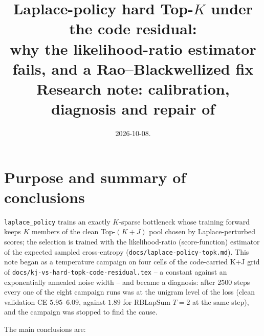 \documentclass[11pt,a4paper]{article}
\title{Laplace-policy hard Top-$K$ under the code residual:\\
why the likelihood-ratio estimator fails, and a Rao--Blackwellized fix\\[2pt]
\large Research note: calibration, diagnosis and repair of \code{surrogate\_mode: laplace\_policy}}
\author{}
\date{2026-10-08.}
\newcommand{\code}[1]{\texttt{#1}}
\begin{document}
\maketitle
\vspace{-2em}

\section{Purpose and summary of conclusions}

\code{laplace\_policy} trains an exactly $K$-sparse bottleneck whose training
forward keeps $K$ members of the clean Top-$(K{+}J)$ pool chosen by
Laplace-perturbed scores; the selection is trained with the likelihood-ratio
(score-function) estimator of the expected sampled cross-entropy
(\code{docs/laplace-policy-topk.md}). This note began as a temperature
campaign on four cells of the code-carried K+J grid of
\code{docs/kj-vs-hard-topk-code-residual.tex} -- a constant against an
exponentially annealed noise width -- and became a diagnosis: after 2500 steps
every one of the eight campaign runs was at the unigram level of the loss
(clean validation CE $5.95$--$6.09$, against $1.89$ for RBLapSum $T=2$ at the
same step), and the campaign was stopped to find the cause.

The main conclusions are:
\end{document}

